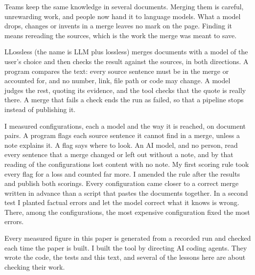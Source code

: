 Teams keep the same knowledge in several documents. Merging them is careful, unrewarding work, and people now hand it to language models. What a model drops, changes or invents in a merge leaves no mark on the page. Finding it means rereading the sources, which is the work the merge was meant to save.

LLossless (the name is LLM plus lossless) merges documents with a model of the user's choice and then checks the result against the sources, in both directions. A program compares the text: every source sentence must be in the merge or accounted for, and no number, link, file path or code may change. A model judges the rest, quoting its evidence, and the tool checks that the quote is really there. A merge that fails a check ends the run as failed, so that a pipeline stops instead of publishing it.

I measured  configurations, each a model and the way it is reached, on  document pairs. A program flags each source sentence it cannot find in a merge, unless a note explains it. A flag says where to look. An AI model, and no person, read every sentence that a merge changed or left out without a note, and by that reading  of the  configurations lost content with no note. My first scoring rule took every flag for a loss and counted far more. I amended the rule after the results and publish both scorings. Every configuration came closer to a correct merge written in advance than a script that pastes the documents together. In a second test I planted factual errors and let the model correct what it knows is wrong. There, among the  configurations, the most expensive configuration fixed the most errors.

Every measured figure in this paper is generated from a recorded run and checked each time the paper is built. I built the tool by directing AI coding agents. They wrote the code, the tests and this text, and several of the lessons here are about checking their work.
